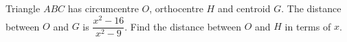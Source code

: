 Triangle $ABC$ has circumcentre $O$, orthocentre $H$ and centroid $G$. The distance between $O$ and $G$ is $\dfrac{x^2-16}{x^2-9}$. Find the distance between $O$ and $H$ in terms of $x$.

